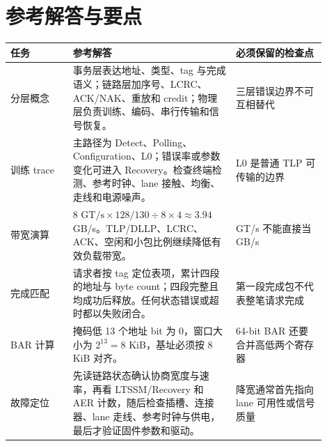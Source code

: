\section*{参考解答与要点}

\begin{longtable}{L{0.18\linewidth}L{0.46\linewidth}L{0.26\linewidth}}
\toprule
任务 & 参考解答 & 必须保留的检查点 \\
\midrule
分层概念 & 事务层表达地址、类型、tag 与完成语义；链路层加序号、LCRC、ACK/NAK、重放和 credit；物理层负责训练、编码、串行传输和信号恢复。 & 三层错误边界不可互相替代 \\
训练 trace & 主路径为 Detect、Polling、Configuration、L0；错误率或参数变化可进入 Recovery。检查终端检测、参考时钟、lane 接触、均衡、走线和电源噪声。 & L0 是普通 TLP 可传输的边界 \\
带宽演算 & $8\text{ GT/s}\times128/130\div8\times4\approx3.94$ GB/s。TLP/DLLP、LCRC、ACK、空闲和小包比例继续降低有效负载带宽。 & GT/s 不能直接当 GB/s \\
完成匹配 & 请求者按 tag 定位表项，累计四段的地址与 byte count；四段完整且均成功后释放。任何状态错误或超时都以失败闭合。 & 第一段完成包不代表整笔请求完成 \\
BAR 计算 & 掩码低 13 个地址 bit 为 0，窗口大小为 $2^{13}=8$ KiB，基址必须按 8 KiB 对齐。 & 64-bit BAR 还要合并高低两个寄存器 \\
故障定位 & 先读链路状态确认协商宽度与速率，再看 LTSSM/Recovery 和 AER 计数，随后检查插槽、连接器、lane 走线、参考时钟与供电，最后才验证固件参数和驱动。 & 降宽通常首先指向 lane 可用性或信号质量 \\
\bottomrule
\end{longtable}
